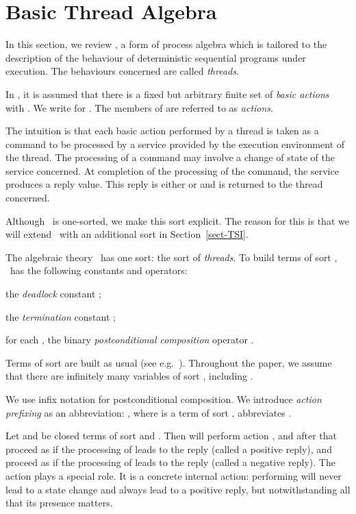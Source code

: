 \documentclass[fleqn]{llncs}
\begin{document}
\section{Basic Thread Algebra}
\label{sect-BTA}

In this section, we review \BTA, a form of process algebra which is
tailored to the description of the behaviour of deterministic sequential
programs under execution.
The behaviours concerned are called \emph{threads}.

In \BTA, it is assumed that there is a fixed but arbitrary finite set of
\emph{basic actions}  with .
We write  for .
The members of  are referred to as \emph{actions}.

The intuition is that each basic action performed by a thread is taken
as a command to be processed by a service provided by the execution
environment of the thread.
The processing of a command may involve a change of state of the service
concerned.
At completion of the processing of the command, the service produces a
reply value.
This reply is either  or  and is returned to the thread
concerned.

Although \BTA\ is one-sorted, we make this sort explicit.
The reason for this is that we will extend \BTA\ with an additional sort
in Section~\ref{sect-TSI}.

The algebraic theory \BTA\ has one sort: the sort  of
\emph{threads}.
To build terms of sort , \BTA\ has the following constants and
operators:
\begin{iteml}
\item
the \emph{deadlock} constant ;
\item
the \emph{termination} constant ;
\item
for each , the binary \emph{postconditional composition}
operator .
\end{iteml}
Terms of sort  are built as usual (see e.g.~\cite{ST99a,Wir90a}).
Throughout the paper, we assume that there are infinitely many variables
of sort , including .

We use infix notation for postconditional composition.
We introduce \emph{action prefixing} as an abbreviation: ,
where  is a term of sort , abbreviates .

Let  and  be closed terms of sort  and .
Then  will perform action , and after that proceed as
 if the processing of  leads to the reply  (called a
positive reply), and proceed as  if the processing of  leads to
the reply  (called a negative reply).
The action  plays a special role.
It is a concrete internal action: performing  will never lead to a
state change and always lead to a positive reply, but notwithstanding
all that its presence matters.
\end{document}
